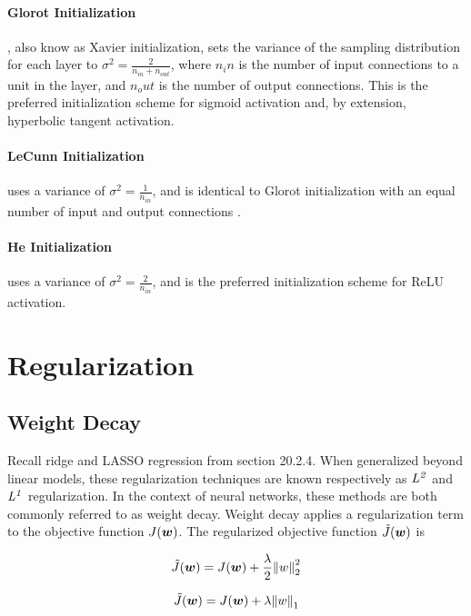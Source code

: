 \documentclass{article}
\begin{document}
\paragraph*{Glorot Initialization}, also know as Xavier initialization, sets the variance of the sampling distribution for each layer to \(\sigma^2 = \frac{2}{n_{in} + n_{out}}\), where \(n_in\) is the number of input connections to a unit in the layer, and \(n_out\) is the number of output connections. This is the preferred initialization scheme for sigmoid activation \cite{pml1book} and, by extension, hyperbolic tangent activation.

\paragraph*{LeCunn Initialization} uses a variance of \(\sigma^2 = \frac{1}{n_{in}}\), and is identical to Glorot initialization with an equal number of input and output connections \cite{pml1book}.

\paragraph*{He Initialization} uses a variance of \(\sigma^2 = \frac{2}{n_{in}}\), and is the preferred initialization scheme for ReLU activation. 

\section{Regularization} %

\subsection{Weight Decay} %

Recall ridge and LASSO regression from section 20.2.4. When generalized beyond linear models, these regularization techniques are known respectively as \(\it{L}^2\) and \(\it{L}^1\) regularization. In the context of neural networks, these methods are both commonly referred to as weight decay. Weight decay applies a regularization term to the objective function \(J(\vb*{w})\). The regularized objective function \(\tilde{J}(\vb*{w})\) is 

\[\tilde{J}(\vb*{w}) = J(\vb*{w}) +\frac{\lambda}{2}\norm{w}^2_2\]

\[\tilde{J}(\vb*{w}) = J(\vb*{w}) +\lambda\norm{w}_1\]
\end{document}
